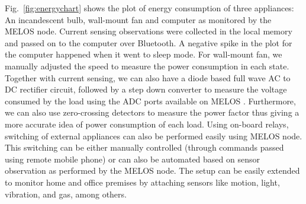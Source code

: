 \documentclass[10pt]{sigplan-proc-varsize}
\newcommand{\figref}[1]{Fig.~\ref{#1}}
\newcommand{\redcolor}[1]{\textcolor{red}{#1}}
\newcommand{\melos}{MELOS }
\begin{document}
\begin{figure*}
\centering
{}
\caption{Energy consumption of Incandescent bulb, Wall-mount Fan and Computer which also shows modes of each appliance }
\label{fig:energychart}
\end{figure*}


\figref{fig:energychart} shows the plot of energy consumption of three appliances: An incandescent bulb,  wall-mount fan and computer as monitored by the \melos node. Current sensing observations were collected in the local memory and passed on to the computer over Bluetooth. A negative spike in the plot for the computer happened when it went to sleep mode. For wall-mount fan, we manually adjusted the speed to measure the power consumption in each state. 
Together with current sensing, we can also have a diode based full wave AC to DC rectifier circuit, followed by a step down converter to measure the voltage consumed by the load using the ADC ports available on \melos . Furthermore, we can also use zero-crossing detectors to measure the power factor thus giving a more accurate idea of power consumption of each load. Using on-board relays, switching of external appliances can also be performed easily using \melos node. This switching can be either manually controlled (through commands passed using remote mobile phone) or can also be automated based on sensor observation as performed by the \melos node. The setup can be easily extended to monitor home and office premises by attaching sensors like motion, light, vibration, and gas, among others.
\end{document}
